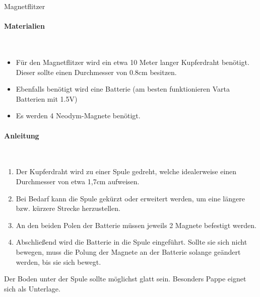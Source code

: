 \documentclass[a4paper, 12pt]{report}
\begin{document}
	\thispagestyle{empty}
	
	{
		\centering
		\Huge
		\color{blue}
		Magnetflitzer
	}
	
	\centering
	\raggedright
	\paragraph{\color{blue}Materialien} \mbox{} \\
	\begin{itemize}
		\item Für den Magnetflitzer wird ein etwa 10 Meter langer Kupferdraht benötigt.
		Dieser sollte einen Durchmesser von 0.8cm besitzen.
		\item Ebenfalls benötigt wird eine Batterie (am besten funktionieren Varta Batterien mit 1.5V)
		\item Es werden 4 Neodym-Magnete benötigt. 
	\end{itemize}
	\paragraph{\color{blue}Anleitung} \mbox{} \\
	\begin{enumerate}
		\item Der Kupferdraht wird zu einer Spule gedreht, welche idealerweise einen Durchmesser von etwa 1,7cm aufweisen.
		\item Bei Bedarf kann die Spule gekürzt oder erweitert werden, um eine längere bzw. kürzere Strecke herzustellen.
		\item An den beiden Polen der Batterie müssen jeweils 2 Magnete befestigt werden.
		\item Abschließend wird die Batterie in die Spule eingeführt. Sollte sie sich nicht bewegen, muss die Polung der Magnete an der Batterie solange geändert werden, bis sie sich bewegt.
	\end{enumerate}
	Der Boden unter der Spule sollte möglichst glatt sein. 
	Besonders Pappe eignet sich als Unterlage.
	
	
\end{document}
